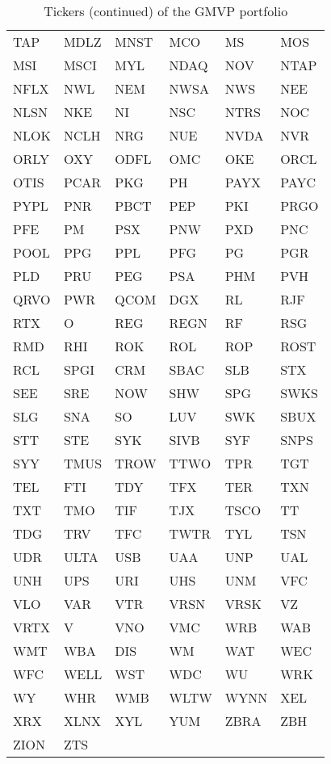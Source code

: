 \documentclass[a4paper]{report}
\begin{document}
\begin{table}[htbp]
\caption{Tickers (continued) of the GMVP portfolio}
\label{table:tickersCont}
\centering
\begin{tabular}{ |C{2cm}|C{2cm}|C{2cm}|C{2cm}|C{2cm}|C{2cm}|  }
	\hline
	TAP & MDLZ & MNST & MCO & MS & MOS\\
	MSI & MSCI & MYL & NDAQ & NOV & NTAP\\
	NFLX & NWL & NEM & NWSA & NWS & NEE\\
	NLSN & NKE & NI & NSC & NTRS & NOC\\
	NLOK & NCLH & NRG & NUE & NVDA & NVR\\
	ORLY & OXY & ODFL & OMC & OKE & ORCL\\
	OTIS & PCAR & PKG & PH & PAYX & PAYC\\
	PYPL & PNR & PBCT & PEP & PKI & PRGO\\
	PFE & PM & PSX & PNW & PXD & PNC\\
	POOL & PPG & PPL & PFG & PG & PGR\\
	PLD & PRU & PEG & PSA & PHM & PVH\\
	QRVO & PWR & QCOM & DGX & RL & RJF\\
	RTX & O & REG & REGN & RF & RSG\\
	RMD & RHI & ROK & ROL & ROP & ROST\\
	RCL & SPGI & CRM & SBAC & SLB & STX\\
	SEE & SRE & NOW & SHW & SPG & SWKS\\
	SLG & SNA & SO & LUV & SWK & SBUX\\
	STT & STE & SYK & SIVB & SYF & SNPS\\
	SYY & TMUS & TROW & TTWO & TPR & TGT\\
	TEL & FTI & TDY & TFX & TER & TXN\\
	TXT & TMO & TIF & TJX & TSCO & TT\\
	TDG & TRV & TFC & TWTR & TYL & TSN\\
	UDR & ULTA & USB & UAA & UNP & UAL\\
	UNH & UPS & URI & UHS & UNM & VFC\\
	VLO & VAR & VTR & VRSN & VRSK & VZ\\
	VRTX & V & VNO & VMC & WRB & WAB\\
	WMT & WBA & DIS & WM & WAT & WEC\\
	WFC & WELL & WST & WDC & WU & WRK\\
	WY & WHR & WMB & WLTW & WYNN & XEL\\
	XRX & XLNX & XYL & YUM & ZBRA & ZBH\\
	ZION & ZTS & & & & \\
	\hline
\end{tabular}
\end{table}
\end{document}
